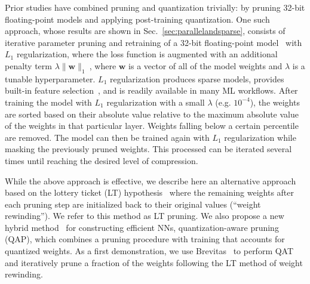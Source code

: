 \documentclass[sigconf]{acmart}
\newcommand{\norm}[1]{\|#1\|}
\renewcommand{\vec}[1]{\boldsymbol{#1}}
\begin{document}
Prior studies have combined pruning and quantization trivially: by pruning 32-bit floating-point models and applying post-training quantization. 
One such approach, whose results are shown in Sec.~\ref{sec:parallelandsparse}, consists of iterative parameter pruning and retraining of a 32-bit floating-point model~\cite{DBLP:journals/corr/HanPTD15,DBLP:journals/corr/HanMD15,Duarte:2018ite} with $L_1$ regularization, where the loss function is augmented with an additional penalty term $\lambda \norm{\vec w}_1~$, where $\vec w$ is a vector of all of the model weights and $\lambda$ is a tunable hyperparameter.
$L_1$ regularization produces sparse models, provides built-in feature selection~\cite{Ng:2004:FSL:1015330.1015435}, and is readily available in many ML workflows. 
After training the model with $L_1$ regularization with a small $\lambda$ (e.g. $10^{-4}$), the weights are sorted based on their absolute value relative to the maximum absolute value of the weights in that particular layer. 
Weights falling below a certain percentile are removed.
The model can then be trained again with $L_1$ regularization while masking the previously pruned weights.
This processed can be iterated several times until reaching the desired level of compression.


While the above approach is effective, we describe here an alternative approach based on the lottery ticket (LT) hypothesis~\cite{lotteryticket} where the remaining weights after each pruning step are initialized back to their original values (``weight rewinding'').
We refer to this method as LT pruning.
We also propose a new hybrid method~\cite{Hawks:2021ruw} for constructing efficient NNs, quantization-aware pruning (QAP), which combines a pruning procedure with training that accounts for quantized weights.  
As a first demonstration, we use Brevitas~\cite{brevitas} to perform QAT and iteratively prune a fraction of the weights following the LT method of weight rewinding. 
\end{document}
